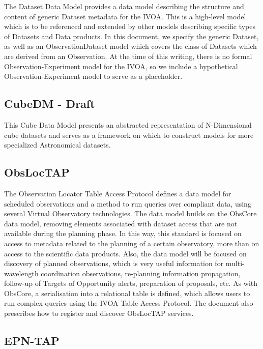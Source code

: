 \documentclass[11pt,a4paper]{ivoa}
\begin{document}
The Dataset Data Model provides a data model describing the structure and content of generic 
Dataset metadata for the IVOA. This is a high-level model which is to be referenced and 
extended by other models describing specific types of Datasets and Data products. In 
this document, we specify the generic Dataset, as well as an ObservationDataset model 
which covers the class of Datasets which are derived from an Observation. At the time of 
this writing, there is no formal Observation-Experiment model for the IVOA, so we include 
a hypothetical Observation-Experiment model to serve as a placeholder. 

\subsection{CubeDM - Draft}

This Cube Data Model presents an abstracted representation of N-Dimensional cube datasets and 
serves as a framework on which to construct models for more specialized Astronomical datasets. 

\subsection{ObsLocTAP} 

The Observation Locator Table Access Protocol defines a data model for scheduled observations 
and a method to run queries over compliant data, using several Virtual Observatory technologies.
The data model builds on the ObsCore data model, removing elements associated with dataset 
access that are not available during the planning phase. In this way, this standard is focused 
on access to metadata related to the planning of a certain observatory, more than on access to 
the scientific data products. Also, the data model will be focused on discovery of planned 
observations, which is very useful information for multi-wavelength coordination observations, 
re-planning information propagation, follow-up of Targets of Opportunity alerts, preparation 
of proposals, etc. As with ObsCore, a serialisation into a relational table is defined, which 
allows users to run complex queries using the IVOA Table Access Protocol. The document also 
prescribes how to register and discover ObsLocTAP services. 

\subsection{EPN-TAP}
\end{document}
